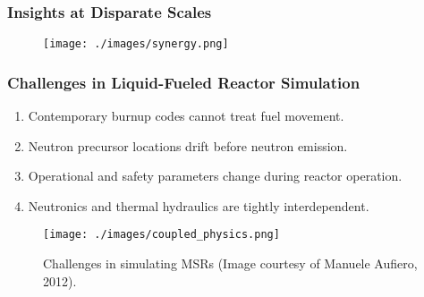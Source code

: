 
\begin{frame}
  \frametitle{Insights at Disparate Scales}
               \begin{figure}[t]
                \vspace*{-0.1in}
			\hspace*{-0.35in}
                \texttt{[image: ./images/synergy.png]}
               \end{figure}            
\end{frame}

\begin{frame}
  \frametitle{Challenges in Liquid-Fueled Reactor Simulation}
                  \vspace*{-0.05in}
               \begin{enumerate}
                \item Contemporary burnup codes cannot treat fuel movement.
                \item Neutron precursor locations drift before neutron emission.
                \item Operational and safety parameters change during reactor operation.
                \item Neutronics and thermal hydraulics are tightly interdependent.
               \end{enumerate}

           \begin{figure}[t]
                \vspace*{-0.05in}
			\hspace*{-0.2in}
                \texttt{[image: ./images/coupled\_physics.png]}
		\vspace*{-0.05in}
		\caption{Challenges in simulating \glspl{MSR} (Image courtesy of Manuele Aufiero, 2012).}
     	 \end{figure}               
\end{frame}

